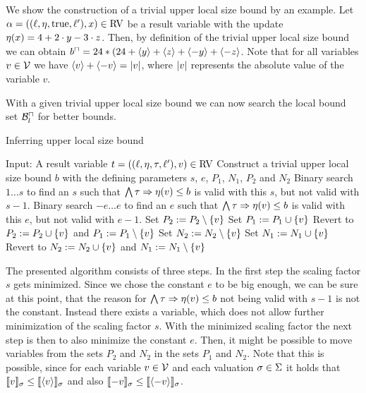 

We show the construction of a trivial upper local size bound by an example.
Let $\alpha = ((\ell,\eta,\text{true},\ell'),x) \in \text{RV}$ be a result variable with the update $\eta(x) = 4 + 2 \cdot y - 3 \cdot z$.
Then, by definition of the trivial upper local size bound we can obtain $b^\sqcap = 24 * (24 + \langle y\rangle + \langle z\rangle + \langle-y\rangle + \langle-z\rangle$.
Note that for all variables $v \in \mathcal{V}$ we have $\langle v\rangle + \langle-v\rangle = \left|v\right|$, where $\left|v\right|$ represents the absolute value of the variable $v$.

With a given trivial upper local size bound we can now search the local bound set $\mathcal{B}^\sqcap_l$ for better bounds.

\begin{algorithm}
\caption{Inferring upper local size bound}\label{ulsb_algorithm}
\begin{algorithmic}[1]
  \State Input: A result variable $t = ((\ell,\eta,\tau,\ell'),v) \in \text{RV}$
  \State Construct a trivial upper local size bound $b$ with the defining parameters $s$, $e$, $P_1$, $N_1$, $P_2$ and $N_2$
  \State Binary search $1 \dots s$ to find an $s$ such that $\bigwedge \tau \Rightarrow \eta(v) \leq b$ is valid with this $s$, but not valid with $s-1$.
  \State Binary search $-e \dots e$ to find an $e$ such that $\bigwedge \tau \Rightarrow \eta(v) \leq b$ is valid with this $e$, but not valid with $e-1$.
    \State Set $P_2 := P_2 \setminus \lbrace v \rbrace$
      \State Set $P_1 := P_1 \cup \lbrace v \rbrace$
        \State Revert to $P_2 := P_2 \cup \lbrace v \rbrace$ and $P_1 := P_1 \setminus \lbrace v \rbrace$
      \EndIf
    \EndIf
    \State Set $N_2 := N_2 \setminus \lbrace v \rbrace$
      \State Set $N_1 := N_1 \cup \lbrace v \rbrace$
        \State Revert to $N_2 := N_2 \cup \lbrace v \rbrace$ and $N_1 := N_1 \setminus \lbrace v \rbrace$
      \EndIf
    \EndIf
  \EndFor
\end{algorithmic}
\end{algorithm}

The presented algorithm consists of three steps.
In the first step the scaling factor $s$ gets minimized.
Since we chose the constant $e$ to be big enough, we can be sure at this point, that the reason for $\bigwedge \tau \Rightarrow \eta(v) \leq b$ not being valid with $s-1$ is not the constant.
Instead there exists a variable, which does not allow further minimization of the scaling factor $s$.
With the minimized scaling factor the next step is then to also minimize the constant $e$.
Then, it might be possible to move variables from the sets $P_2$ and $N_2$ in the sets $P_1$ and $N_2$.
Note that this is possible, since for each variable $v \in \mathcal{V}$ and each valuation $\sigma \in \Sigma$ it holds that $\llbracket v \rrbracket_{\sigma} \leq \llbracket \langle v\rangle \rrbracket_{\sigma}$ and also $\llbracket -v \rrbracket_{\sigma} \leq \llbracket \langle-v\rangle \rrbracket_{\sigma}$.

